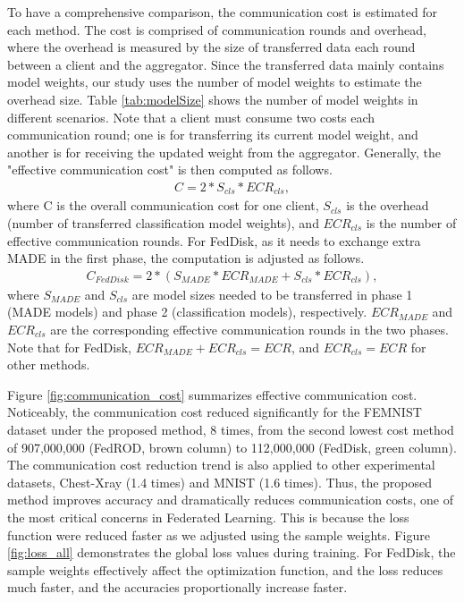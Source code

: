 \documentclass[journal]{IEEEtai}
\begin{document}
To have a comprehensive comparison, the communication cost is estimated for each method. The cost is comprised of communication rounds and overhead, where the overhead is measured by the size of transferred data each round between a client and the aggregator. Since the transferred data mainly contains model weights, our study uses the number of model weights to estimate the overhead size. Table \ref{tab:modelSize} shows the number of model weights in different scenarios. Note that a client must consume two costs each communication round; one is for transferring its current model weight, and another is for receiving the updated weight from the aggregator. Generally, the "effective communication cost" is then computed as follows. 
\begin{align}
    C = 2*S_{cls}*ECR_{cls} ,
\end{align}
where C is the overall communication cost for one client, $S_{cls}$ is the overhead (number of transferred classification model weights), and $ECR_{cls}$ is the number of effective communication rounds. For FedDisk, as it needs to exchange extra MADE in the first phase, the computation is adjusted as follows.
\begin{align}
    C_{FedDisk} = 2* (S_{MADE}*ECR_{MADE} + S_{cls}*ECR_{cls}) ,
\end{align}
where $S_{MADE}$ and $S_{cls}$ are model sizes needed to be transferred in phase 1 (MADE models) and phase 2 (classification models), respectively. $ECR_{MADE}$ and $ECR_{cls}$ are the corresponding effective communication rounds in the two phases. Note that for FedDisk, $ECR_{MADE} + ECR_{cls} = ECR$, and $ECR_{cls} = ECR$ for other methods.  

Figure \ref{fig:communication_cost} summarizes effective communication cost. Noticeably, the communication cost reduced significantly for the FEMNIST dataset under the proposed method, 8 times, from the second lowest cost method of 907,000,000 (FedROD, brown column) to 112,000,000 (FedDisk, green column). The communication cost reduction trend is also applied to other experimental datasets, Chest-Xray (1.4 times) and MNIST (1.6 times). Thus, the proposed method improves accuracy and dramatically reduces communication costs, one of the most critical concerns in Federated Learning. This is because the loss function were reduced faster as we adjusted using the sample weights. Figure \ref{fig:loss_all} demonstrates the global loss values during training. For FedDisk, the sample weights effectively affect the optimization function, and the loss reduces much faster, and the accuracies proportionally increase faster.   
\end{document}
